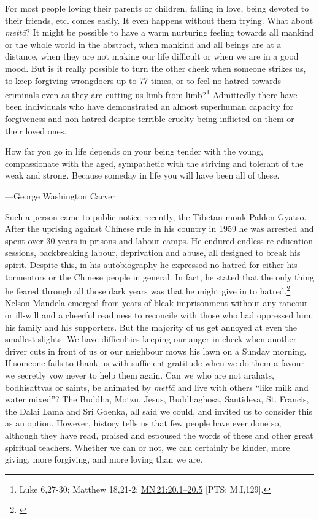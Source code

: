 \documentclass[10pt, openright]{book}
\newenvironment{epigram-2}%
{%
\setstretch{1.4}
\vspace{1em}
\noindent
\quoting[leftmargin=2cm,rightmargin=2cm]%
\begin{itshape}
\large
}%
{\end{itshape}\endquoting
}%
\newenvironment{epigram-2-cite}%
{%
\quoting[leftmargin=2cm,rightmargin=2cm]%
\noindent\normal\hspace*{\fill} 
}%
{\endquoting
}%
\begin{document}
For most people loving their parents or children, falling in love, being devoted to their friends, etc. comes easily. It even happens without them trying. What about \textit{mettā}? It might be possible to have a warm nurturing feeling towards all mankind or the whole world in the abstract, when mankind and all beings are at a distance, when they are not making our life difficult or when we are in a good mood. But is it really possible to turn the other cheek when someone strikes us, to keep forgiving wrongdoers up to 77 times, or to feel no hatred towards criminals even as they are cutting us limb from limb?\footnote {Luke 6,27-30; Matthew 18,21-2; \href{https://suttacentral.net/mn21/en/sujato\#20.1}{MN 21:20.1–20.5} [PTS: M.I,129].} Admittedly there have been individuals who have demonstrated an almost superhuman capacity for forgiveness and non-hatred despite terrible cruelty being inflicted on them or their loved ones.


\begin{epigram-2}
How far you go in life depends on your being tender with the young, compassionate with the aged, sympathetic with the striving and tolerant of the weak and strong. Because someday in life you will have been all of these.
\end{epigram-2}
\begin{epigram-2-cite}
—George Washington Carver
\end{epigram-2-cite}

Such a person came to public notice recently, the Tibetan monk Palden Gyatso. After the uprising against Chinese rule in his country in 1959 he was arrested and spent over 30 years in prisons and labour camps. He endured endless re-education sessions, backbreaking labour, deprivation and abuse, all designed to break his spirit. Despite this, in his autobiography he expressed no hatred for either his tormentors or the Chinese people in general. In fact, he stated that the only thing he feared through all those dark years was that he might give in to hatred.\footnote {\cite{Palden 1997}} Nelson Mandela emerged from years of bleak imprisonment without any rancour or ill-will and a cheerful readiness to reconcile with those who had oppressed him, his family and his supporters. But the majority of us get annoyed at even the smallest slights. We have difficulties keeping our anger in check when another driver cuts in front of us or our neighbour mows his lawn on a Sunday morning. If someone fails to thank us with sufficient gratitude when we do them a favour we secretly vow never to help them again. Can we who are not arahats, bodhisattvas or saints, be animated by \textit{mettā} and live with others “like milk and water mixed”? The Buddha, Motzu, Jesus, Buddhaghosa, Santideva, St. Francis, the Dalai Lama and Sri Goenka, all said we could, and invited us to consider this as an option. However, history tells us that few people have ever done so, although they have read, praised and espoused the words of these and other great spiritual teachers. Whether we can or not, we can certainly be kinder, more giving, more forgiving, and more loving than we are.
\end{document}
